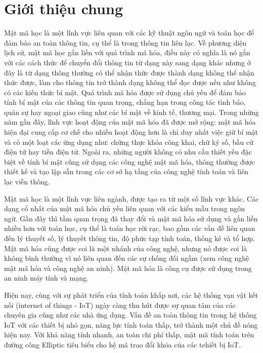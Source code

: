 \documentclass[a4paper,12pt]{report}
\begin{document}
\chapter*{Giới thiệu chung}
Mật mã học là một lĩnh vực liên quan với các kỹ thuật ngôn ngữ và toán học để đảm bảo an toàn thông tin, cụ thể là trong thông tin liên lạc. Về phương diện lịch sử, mật mã học gắn liền với quá trình mã hóa, điều này có nghĩa là nó gắn với các cách thức để chuyển đổi thông tin từ dạng này sang dạng khác nhưng ở đây là từ dạng thông thường có thể nhận thức được thành dạng không thể nhận thức được, làm cho thông tin trở thành dạng không thể đọc được nếu như không có các kiến thức bí mật. Quá trình mã hóa được sử dụng chủ yếu để đảm bảo tính bí mật của các thông tin quan trọng, chẳng hạn trong công tác tình báo, quân sự hay ngoại giao cũng như các bí mật về kinh tế, thương mại.  Trong những năm gần đây, lĩnh vực hoạt động của mật mã hóa đã được mở rộng: mật mã hóa hiện đại cung cấp cơ chế cho nhiều hoạt động hơn là chỉ duy nhất việc giữ bí mật và có một loạt các ứng dụng như: chứng thực khóa công khai, chữ ký số, bầu cử điện tử hay tiền điện tử. Ngoài ra, những người không có nhu cầu thiết yếu đặc biệt về tính bí mật cũng sử dụng các công nghệ mật mã hóa, thông thường được thiết kế và tạo lập sẵn trong các cơ sở hạ tầng của công nghệ tính toán và liên lạc viễn thông. 

Mật mã học là một lĩnh vực liên ngành, được tạo ra từ một số lĩnh vực khác. Các dạng cổ nhất của mật mã hóa chủ yếu liên quan với các kiểu mẫu trong ngôn ngữ. Gần đây thì tầm quan trọng đã thay đổi và mật mã hóa sử dụng và gắn liền nhiều hơn với toán học, cụ thể là toán học rời rạc, bao gồm các vấn đề liên quan đến lý thuyết số, lý thuyết thông tin, độ phức tạp tính toán, thống kê và tổ hợp. Mật mã hóa cũng được coi là một nhánh của công nghệ, nhưng nó được coi là không bình thường vì nó liên quan đến các sự chống đối ngầm (xem công nghệ mật mã hóa và công nghệ an ninh). Mật mã hóa là công cụ được sử dụng trong an ninh máy tính và mạng. 

Hiện nay, cùng với sự phát triển của tính toán khắp nơi, các hệ thống vạn vật kết nối (internet of things - IoT) ngày càng thu hút được sự quan tâm của các chuyên gia cũng như các nhà ứng dụng. Vấn đề an toàn thông tin trong hệ thống IoT với các thiết bị nhỏ gọn, năng lực tính toán thấp, trở thành một chủ đề nóng hiện nay. Với khả năng tính nhanh, an toàn chi phí thấp, mật mã tính toán trên đường công Elliptic tiêu biểu cho hệ mã trao đổi khóa của các tehiết bị IoT.
\end{document}
